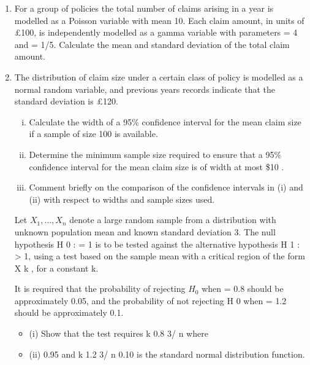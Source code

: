 \documentclass[a4paper,12pt]{article}
\begin{document}
\begin{enumerate}

\item For a group of policies the total number of claims arising in a year is modelled as a Poisson variable with mean 10. Each claim amount, in units of £100, is independently modelled as a gamma variable with parameters = 4 and = 1/5.
Calculate the mean and standard deviation of the total claim amount.

\item 

The distribution of claim size under a certain class of policy is modelled as a normal random variable, and previous years records indicate that the standard deviation is £120.

\begin{enumerate}[(i)]
\item Calculate the width of a 95\% confidence interval for the mean claim size if a sample of size 100 is available.

\item Determine the minimum sample size required to ensure that a 95\% confidence interval for the mean claim size is of width at most \$10 .

\item Comment briefly on the comparison of the confidence intervals in (i) and (ii) with respect to widths and sample sizes used.
\end{enumerate}

\newpage 
Let $X_1 , \ldots , X_n$ denote a large random sample from a distribution with unknown population mean and known standard deviation 3. The null hypothesis H 0 : = 1 is to be tested against the alternative hypothesis H 1 : > 1, using a test based on the
sample mean with a critical region of the form X
k , for a constant k.

It is required that the probability of rejecting $H_0$ when = 0.8 should be approximately 0.05, and the probability of not rejecting H 0 when = 1.2 should be approximately 0.1.

\begin{itemize}
\item (i)
Show that the test requires
k 0.8
3/ n
where
\item (ii)
0.95 and
k 1.2
3/ n
0.10
is the standard normal distribution function.


\end{itemize}
\end{enumerate}
\end{document}
